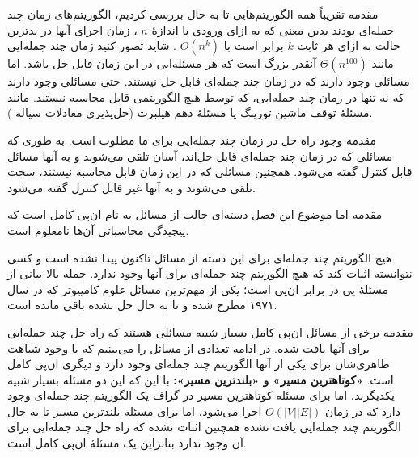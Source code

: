 \begin{itemframe}{مقدمه}
\itm
تقریباً همه الگوریتم‌هایی تا به حال بررسی کردیم، الگوریتم‌های زمان چند جمله‌ای
 بودند بدین معنی که به ازای ورودی با اندازهٔ
$n$
، زمان اجرای آنها در بدترین حالت به ازای هر ثابت
$k$
برابر است با
$O(n^k)$ .
\itm
شاید تصور کنید زمان چند جمله‌ایی مانند
$\Theta(n^{100})$
آنقدر بزرگ است که هر مسئله‌ایی در این زمان قابل حل باشد. اما مسائلی وجود دارند که در زمان چند جمله‌ای قابل حل نیستند.
\itm
حتی مسائلی وجود دارند که نه تنها در زمان چند جمله‌ایی،‌ که توسط هیچ الگوریتمی قابل محاسبه نیستند.
مانند مسئلهٔ توقف ماشین تورینگ
یا مسئلهٔ دهم هیلبرت (حل‌پذیری معادلات سیاله
).
\end{itemframe}


\begin{itemframe}{مقدمه}
\itm
وجود راه حل در زمان چند جمله‌ایی برای ما مطلوب است.
\sub
به طوری که مسائلی که در زمان چند جمله‌ای قابل حل‌اند، آسان تلقی می‌شوند و به آنها مسائل قابل کنترل
 گفته می‌شود.
\sub
 همچنین مسائلی که در این زمان قابل محاسبه نیستند، سخت تلقی می‌شوند و به آنها غیر قابل کنترل
گفته می‌شود.
\end{itemframe}


\begin{itemframe}{مقدمه}
\itm
اما موضوع این فصل دسته‌ای جالب از مسائل به نام ان‌پی کامل
است که پیچیدگی محاسباتی آن‌ها نامعلوم است.

\itm
هیچ الگوریتم چند جمله‌ای برای این دسته از مسائل تاکنون پیدا نشده است و کسی نتوانسته اثبات کند که هیچ الگوریتم چند جمله‌ای برای آنها وجود ندارد.
\itm
جمله بالا بیانی از مسئلهٔ پی در برابر ان‌پی
است؛ یکی از مهم‌ترین مسائل علوم کامپیوتر که در سال ۱۹۷۱ مطرح شده و تا به حال حل نشده باقی مانده است.
\end{itemframe}


\begin{itemframe}{مقدمه}
\itm
برخی از مسائل ان‌پی کامل بسیار شبیه مسائلی هستند که راه حل چند جمله‌ایی برای آنها یافت شده. در ادامه تعدادی از مسائل را می‌بینیم که با وجود شباهت ظاهری‌شان برای یکی از آنها الگوریتم چند جمله‌ای وجود دارد و دیگری ان‌پی کامل است.
\itm
\textbf{«کوتاهترین مسیر» و «بلندترین مسیر»:}
با این که این دو مسئله بسیار شبیه یکدیگرند، اما برای مسئله کوتاهترین مسیر در گراف یک الگوریتم چند جمله‌ای وجود دارد که در زمان
$O(|V||E|)$
 اجرا می‌شود، اما برای مسئله بلندترین مسیر تا به حال الگوریتم چند جمله‌ایی یافت نشده همچنین اثبات نشده که راه حل چند جمله‌ایی برای آن وجود ندارد بنابراین یک مسئلهٔ ان‌پی کامل است.
\end{itemframe}



